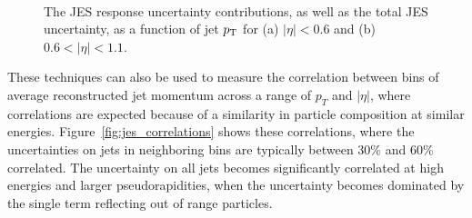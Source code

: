 \begin{figure}[ht]
\centering
{} \\
\caption{ The \acs*{JES} response uncertainty contributions, as well as the total \acs*{JES} uncertainty, as a function of jet $p_{\mathrm{T}}$ for (a) $|\eta| < 0.6$ and (b) $0.6 < |\eta| < 1.1$.}
\label{fig:jes_uncertainty}
\end{figure}

These techniques can also be used to measure the correlation between bins of average reconstructed jet momentum across a range of $p_T$ and $|\eta|$, where correlations are expected because of a similarity in particle composition at similar energies.
Figure~\ref{fig:jes_correlations} shows these correlations, where the uncertainties on jets in neighboring bins are typically between 30\% and 60\% correlated. 
The uncertainty on all jets becomes significantly correlated at high energies and larger pseudorapidities, when the uncertainty becomes dominated by the single term reflecting out of range particles.

